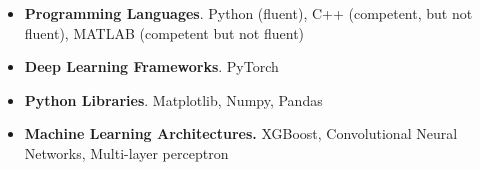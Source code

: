 

\begin{cvparagraph}

\begin{itemize}[leftmargin=*]
    \item \textbf{Programming Languages}. Python (fluent), C++ (competent, but not fluent), MATLAB (competent but not fluent)
    \item \textbf{Deep Learning Frameworks}. PyTorch
    \item \textbf{Python Libraries}. Matplotlib, Numpy, Pandas
    \item \textbf{Machine Learning Architectures.} XGBoost, Convolutional Neural Networks, Multi-layer perceptron
\end{itemize}

\end{cvparagraph}
